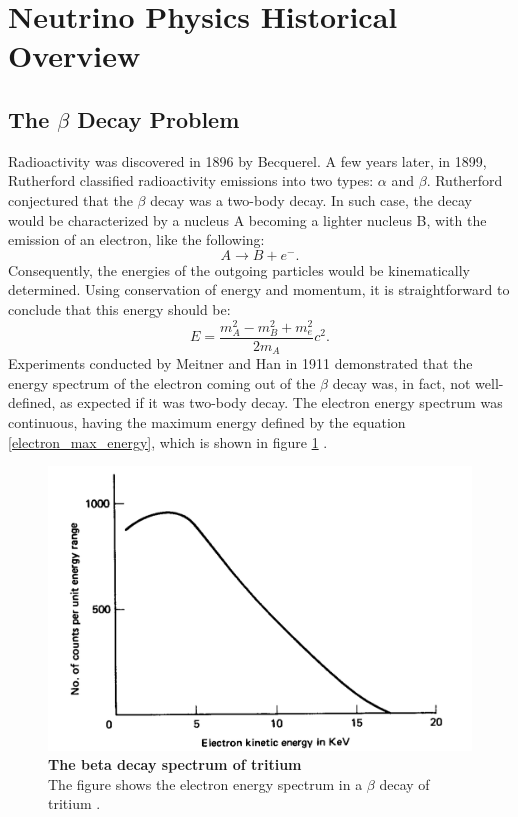 \section{Neutrino Physics Historical Overview}
\label{Chapter:1}
%
\subsection{The $\beta$ Decay Problem}
%
Radioactivity was discovered in 1896 by Becquerel. A few years later, in 1899, Rutherford classified radioactivity emissions into two types: $\alpha$ and $\beta$. Rutherford conjectured that the $\beta$ decay was a two-body decay. In such case, the decay would be characterized by a nucleus A becoming a lighter nucleus B, with the emission of an electron, like the following:
%
\begin{equation}
	A \longrightarrow B + e^- .
\end{equation}
%
Consequently, the energies of the outgoing particles would be kinematically determined. 
Using conservation of energy and momentum, it is straightforward to conclude that this energy should be:
%
\begin{equation}
	E = \frac{m_A^2 - m_B^2 + m_e^2}{2m_A} c^2.
	\label{electron_max_energy} 
\end{equation}
%
Experiments conducted by Meitner and Han in 1911 demonstrated that the energy spectrum of the electron coming out of the $\beta$ decay was, in fact, not well-defined, as expected if it was two-body decay. The electron energy spectrum was continuous, having the maximum energy defined by the equation \ref{electron_max_energy}, which is shown in figure \ref{figure_the_beta_decay_spectrum_of_tritium} \cite{griffiths}.
%
\begin{figure}[h!]
	\begin{center}
		\includegraphics[scale=0.3]{Figures/electron_beta_decay_spectrum.pdf}
		\caption[The $\beta$ decay spectrum of tritium]{ {\textbf{The beta decay spectrum of tritium}} \\The figure shows the electron energy spectrum in a $\beta$ decay of tritium \cite{griffiths}.}
		\label{figure_the_beta_decay_spectrum_of_tritium}	
	\end{center}
\end{figure}
